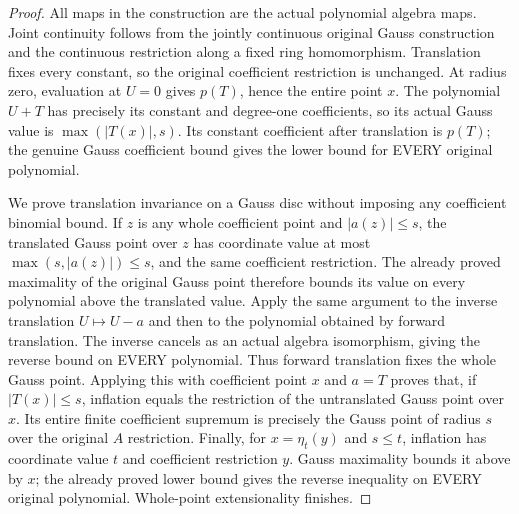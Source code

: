 \begin{proof}
All maps in the construction are the actual polynomial algebra maps. Joint
continuity follows from the jointly continuous original Gauss construction
and the continuous restriction along a fixed ring homomorphism. Translation
fixes every constant, so the original coefficient restriction is unchanged.
At radius zero, evaluation at $U=0$ gives $p(T)$, hence the entire point $x$.
The polynomial $U+T$ has precisely its constant and degree-one coefficients,
so its actual Gauss value is $\max(|T(x)|,s)$. Its constant coefficient after
translation is $p(T)$; the genuine Gauss coefficient bound gives the lower
bound for EVERY original polynomial.

We prove translation invariance on a Gauss disc without imposing any
coefficient binomial bound. If $z$ is any whole coefficient point and
$|a(z)|\leq s$, the translated Gauss point over $z$ has coordinate value
at most $\max(s,|a(z)|)\leq s$, and the same coefficient restriction.
The already proved maximality of the original Gauss point therefore bounds
its value on every polynomial above the translated value. Apply the same
argument to the inverse translation $U\mapsto U-a$ and then to the polynomial
obtained by forward translation. The inverse cancels as an actual algebra
isomorphism, giving the reverse bound on EVERY polynomial. Thus forward
translation fixes the whole Gauss point. Applying this with coefficient
point $x$ and $a=T$ proves that, if $|T(x)|\leq s$, inflation equals the
restriction of the untranslated Gauss point over $x$. Its entire finite
coefficient supremum is precisely the Gauss point of radius $s$ over the
original $A$ restriction. Finally, for $x=\eta_t(y)$ and $s\leq t$, inflation
has coordinate value $t$ and coefficient restriction $y$. Gauss maximality
bounds it above by $x$; the already proved lower bound gives the reverse
inequality on EVERY original polynomial. Whole-point extensionality finishes.
\end{proof}


